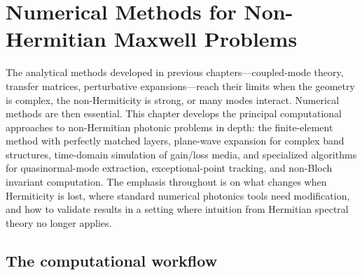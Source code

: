 \chapter{Numerical Methods for Non-Hermitian Maxwell Problems}
\label{ch:numerics}

\begin{chapterlead}
The analytical methods developed in previous chapters---coupled-mode
theory, transfer matrices, perturbative expansions---reach their limits
when the geometry is complex, the non-Hermiticity is strong, or many
modes interact. Numerical methods are then essential. This chapter
develops the principal computational approaches to non-Hermitian photonic
problems in depth: the finite-element method with perfectly matched
layers, plane-wave expansion for complex band structures, time-domain
simulation of gain/loss media, and specialized algorithms for
quasinormal-mode extraction, exceptional-point tracking, and non-Bloch
invariant computation. The emphasis throughout is on what changes when
Hermiticity is lost, where standard numerical photonics tools need
modification, and how to validate results in a setting where intuition
from Hermitian spectral theory no longer applies.
\end{chapterlead}


\section{The computational workflow}
\label{sec:workflow}

